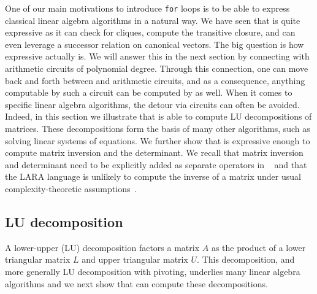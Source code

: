One of our main motivations to introduce \texttt{for} loops is to be able
to express classical linear algebra algorithms in a natural way. We have seen that \langfor is
quite expressive as it can check for cliques, compute the transitive closure, and can even
leverage a successor relation on canonical vectors. The big question is how expressive \langfor
actually is. We will answer this in the next section by connecting \langfor with 
arithmetic circuits of polynomial degree. Through this connection, one can move back and forth between \langfor and arithmetic circuits, and as a consequence, anything computable by such a circuit can be
computed by \langfor as well. When it comes to specific linear algebra algorithms, the detour via circuits
can often be avoided. Indeed, in this section we illustrate that \langfor is able to
compute LU decompositions of matrices. These decompositions form the basis of many other algorithms, such as solving linear systems of equations. We further show that \langfor is expressive enough to compute matrix inversion and the determinant. We recall that matrix inversion and determinant need to be explicitly added as separate operators in \lang~\cite{matlang-journal} and that the LARA language is unlikely to compute the inverse of a matrix under usual complexity-theoretic assumptions~\cite{BarceloH0S20}.

\subsection{LU decomposition}
%
%
A lower-upper (LU) decomposition factors a matrix $A$ as the product of a lower triangular matrix $L$ and upper triangular matrix $U$.  This decomposition, and more generally LU decomposition with pivoting,  underlies many linear algebra algorithms and 
we next show that \langfor can compute these decompositions.

